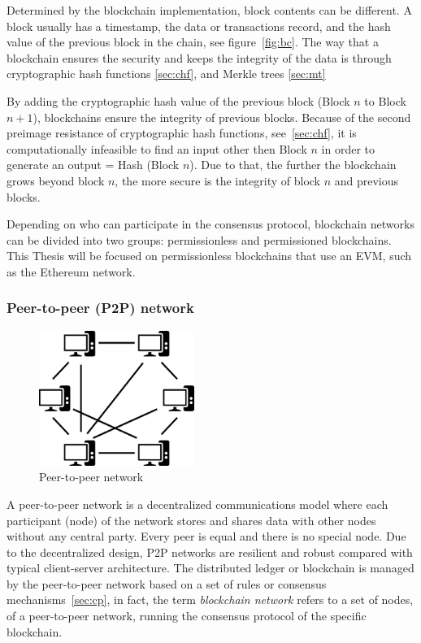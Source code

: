 \documentclass[11pt,a4paper]{report}
\begin{document}
Determined by the blockchain implementation, block contents can be different. A block usually has a timestamp, the data or transactions record, and the hash value of the previous block in the chain, see figure~\ref{fig:bc}.
The way that a blockchain ensures the security and keeps the integrity of the data is through cryptographic hash functions \ref{sec:chf}, and Merkle trees \ref{sec:mt}

By adding the cryptographic hash value of the previous block  (Block $n$ to Block $n+1$), blockchains ensure the integrity of previous blocks. Because of the second preimage resistance of cryptographic hash functions, see~\ref{sec:chf}, it is computationally infeasible to  find an input other then Block $n$ in order to generate an output = Hash (Block $n$). Due to that, the further the blockchain grows beyond block $n$, the more secure is the integrity of block $n$ and previous blocks.

Depending on who can participate in the consensus protocol, blockchain networks can be divided into two groups: permissionless and permissioned blockchains. This Thesis will be focused on permissionless blockchains that use an EVM, such as the Ethereum network.

\subsubsection{Peer-to-peer (P2P) network}\label{subsec:p2p}
\begin{figure}[htp]
	\centering
	\includegraphics[width=0.45\textwidth]{./images/p2p}
	\caption{Peer-to-peer network\cite{wiki:Peer-to-peer}}
	\label{fig:p2p}
\end{figure}
A peer-to-peer network\cite{book:masteringBTCp2p}\cite{wiki:Peer-to-peer} is a decentralized communications model where each participant (node) of the network stores and shares data with other nodes without any central party. Every peer is equal and there is no special node. Due to the decentralized design, P2P networks are resilient and robust compared with typical client-server architecture. The distributed ledger or blockchain is managed by the peer-to-peer network based on a set of rules or consensus mechanisms~\ref{sec:cp}, in fact, the term \emph{blockchain network} refers to a set of nodes, of a peer-to-peer network, running the consensus protocol of the specific blockchain. 
\end{document}

